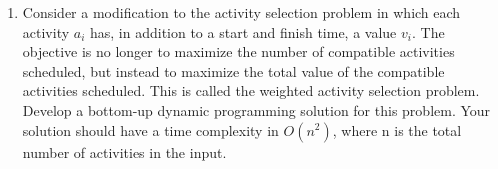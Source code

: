 \documentclass{article}
\begin{document}
\begin{enumerate}
\begin{lstlisting}[language=python]
            \end{lstlisting}
        \item Consider a modification to the activity selection problem in 
        which each activity $a_i$ has, in addition to a start and finish time, 
        a value $v_i$. The objective is no longer to maximize the number of 
        compatible activities scheduled, but instead to maximize the total 
        value of the compatible activities scheduled. This is called the 
        weighted activity selection problem. Develop a bottom-up dynamic 
        programming solution for this problem. Your solution should have a 
        time complexity in $O(n^2)$, where n is the total number of activities 
        in the input.
    \end{enumerate}
\end{document}
